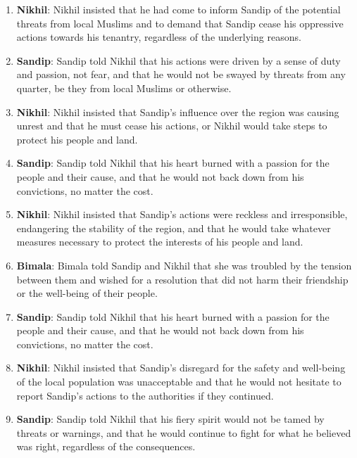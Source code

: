 \documentclass[10pt]{article}
\begin{document}
\begin{enumerate}\setlength{\itemsep}{1pt}\small

\item \textbf{Nikhil}: Nikhil insisted that he had come to inform Sandip of the potential threats from local Muslims and to demand that Sandip cease his oppressive actions towards his tenantry, regardless of the underlying reasons.

\item \textbf{Sandip}: Sandip told Nikhil that his actions were driven by a sense of duty and passion, not fear, and that he would not be swayed by threats from any quarter, be they from local Muslims or otherwise.

\item \textbf{Nikhil}: Nikhil insisted that Sandip's influence over the region was causing unrest and that he must cease his actions, or Nikhil would take steps to protect his people and land.

\item \textbf{Sandip}: Sandip told Nikhil that his heart burned with a passion for the people and their cause, and that he would not back down from his convictions, no matter the cost.

\item \textbf{Nikhil}: Nikhil insisted that Sandip's actions were reckless and irresponsible, endangering the stability of the region, and that he would take whatever measures necessary to protect the interests of his people and land.

\item \textbf{Bimala}: Bimala told Sandip and Nikhil that she was troubled by the tension between them and wished for a resolution that did not harm their friendship or the well-being of their people.

\item \textbf{Sandip}: Sandip told Nikhil that his heart burned with a passion for the people and their cause, and that he would not back down from his convictions, no matter the cost.

\item \textbf{Nikhil}: Nikhil insisted that Sandip's disregard for the safety and well-being of the local population was unacceptable and that he would not hesitate to report Sandip's actions to the authorities if they continued.

\item \textbf{Sandip}: Sandip told Nikhil that his fiery spirit would not be tamed by threats or warnings, and that he would continue to fight for what he believed was right, regardless of the consequences.


\end{enumerate}
\end{document}
